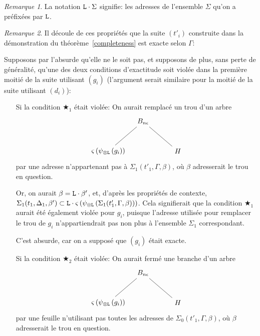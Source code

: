 \documentclass[11pt,a4paper]{article}
\theoremstyle{plain}
\theoremstyle{definition}
\theoremstyle{remark}
\newtheorem{remark}{Remarque}
\newcommand*{\tensor}{\otimes}
\newcommand*{\someperm}{\varsigma}
\newcommand*{\sequent}{\Gamma}
\newcommand*{\sequentbis}{\Delta}
\newcommand*{\Left}{\textnormal{\texttt{L}}}
\newcommand*{\unknown}{H}
\newcommand*{\lowapprox}{\ensuremath{\Sigma_0}}
\newcommand*{\highapprox}{\ensuremath{\Sigma_1}}
\newcommand*{\exactcond}{\bigstar_1}
\newcommand*{\exactcondbis}{\bigstar_2}
\begin{document}
\begin{remark}
    La notation $\Left \cdot \Sigma$ signifie: les adresses de l'ensemble $\Sigma$ qu'on a préfixées par $\Left$.
\end{remark}

\begin{remark}
    Il découle de ces propriétés que la suite $(t'_i)$ construite dans la démonstration du théorème~\ref{completeness} est exacte selon $\sequent$:

    Supposons par l'absurde qu'elle ne le soit pas, et supposons de plus, sans perte de généralité, qu'une des deux conditions d'exactitude soit violée dans la première moitié de la suite utilisant $(g_i)$ (l'argument serait similaire pour la moitié de la suite utilisant $(d_i)$):

    \begin{itemize}
        \item[Si la condition $\exactcond$ était violée:] On aurait remplacé un trou d'un arbre 
            \begin{equation*}
            \begin{tikzpicture}%
            [level 1/.style={sibling distance=3.5cm}]
            \node {$B_{n \epsilon}$}
                child {node {$\someperm \left( \psi_{\tensor\Left} \left(
                g_i\right) \right)$}}
                child {node {$\unknown$}
            };
            \end{tikzpicture}
            \end{equation*}
            par une adresse n'appartenant pas à $\highapprox(t'_1, \sequent, \beta)$, où $\beta$ adresserait le trou en question. 
            
            Or, on aurait $\beta = \Left \cdot \beta'$, et, d'après les propriétés de contexte, $\highapprox(t_1, \sequentbis_1, \beta') \subset \Left \cdot \someperm \left( \psi_{\tensor\Left} \left(\highapprox(t'_1, \sequent, \beta)\right) \right)$. Cela signifierait que la condition $\exactcond$ aurait été également violée pour $g_i$, puisque l'adresse utilisée pour remplacer le trou de $g_i$ n'appartiendrait pas non plus à l'ensemble $\highapprox$ correspondant. 
            
            C'est absurde, car on a supposé que $(g_i)$ était exacte.

        \item[Si la condition $\exactcondbis$ était violée:] On aurait fermé une branche d'un arbre 
            \begin{equation*}
            \begin{tikzpicture}%
            [level 1/.style={sibling distance=3.5cm}]
            \node {$B_{n \epsilon}$}
                child {node {$\someperm \left( \psi_{\tensor\Left} \left(
                g_i\right) \right)$}}
                child {node {$\unknown$}
            };
            \end{tikzpicture}
            \end{equation*}
            par une feuille n'utilisant pas toutes les adresses de $\lowapprox(t'_1, \sequent, \beta)$, où $\beta$ adresserait le trou en question. 
            

\end{itemize}
\end{remark}
\end{document}
